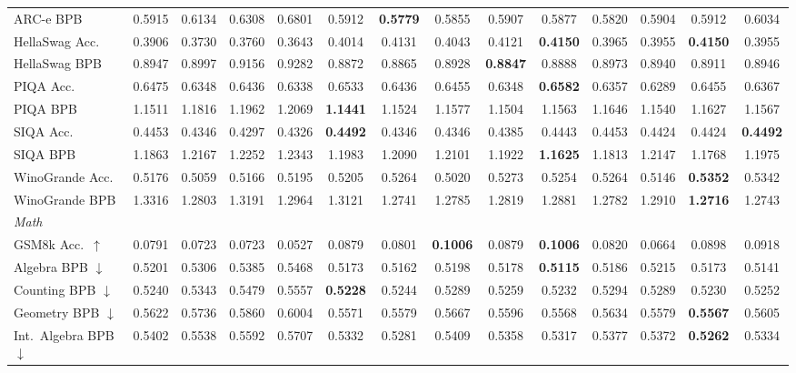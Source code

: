 \documentclass[11pt]{article}
\begin{document}
\begin{table}[t]
{\begin{tabular}{lccccccccccccc}
\quad ARC-e BPB & 0.5915 & 0.6134 & 0.6308 & 0.6801 & 0.5912 & \textbf{0.5779} & 0.5855 & 0.5907 & 0.5877 & 0.5820 & 0.5904 & 0.5912 & 0.6034 \\
\quad HellaSwag Acc. & 0.3906 & 0.3730 & 0.3760 & 0.3643 & 0.4014 & 0.4131 & 0.4043 & 0.4121 & \textbf{0.4150} & 0.3965 & 0.3955 & \textbf{0.4150} & 0.3955 \\
\quad HellaSwag BPB & 0.8947 & 0.8997 & 0.9156 & 0.9282 & 0.8872 & 0.8865 & 0.8928 & \textbf{0.8847} & 0.8888 & 0.8973 & 0.8940 & 0.8911 & 0.8946 \\
\quad PIQA Acc. & 0.6475 & 0.6348 & 0.6436 & 0.6338 & 0.6533 & 0.6436 & 0.6455 & 0.6348 & \textbf{0.6582} & 0.6357 & 0.6289 & 0.6455 & 0.6367 \\
\quad PIQA BPB & 1.1511 & 1.1816 & 1.1962 & 1.2069 & \textbf{1.1441} & 1.1524 & 1.1577 & 1.1504 & 1.1563 & 1.1646 & 1.1540 & 1.1627 & 1.1567 \\
\quad SIQA Acc. & 0.4453 & 0.4346 & 0.4297 & 0.4326 & \textbf{0.4492} & 0.4346 & 0.4346 & 0.4385 & 0.4443 & 0.4453 & 0.4424 & 0.4424 & \textbf{0.4492} \\
\quad SIQA BPB & 1.1863 & 1.2167 & 1.2252 & 1.2343 & 1.1983 & 1.2090 & 1.2101 & 1.1922 & \textbf{1.1625} & 1.1813 & 1.2147 & 1.1768 & 1.1975 \\
\quad WinoGrande Acc. & 0.5176 & 0.5059 & 0.5166 & 0.5195 & 0.5205 & 0.5264 & 0.5020 & 0.5273 & 0.5254 & 0.5264 & 0.5146 & \textbf{0.5352} & 0.5342 \\
\quad WinoGrande BPB & 1.3316 & 1.2803 & 1.3191 & 1.2964 & 1.3121 & 1.2741 & 1.2785 & 1.2819 & 1.2881 & 1.2782 & 1.2910 & \textbf{1.2716} & 1.2743 \\
\midrule
\multicolumn{14}{l}{\textit{Math}} \\
\quad GSM8k Acc.\ $\uparrow$ & 0.0791 & 0.0723 & 0.0723 & 0.0527 & 0.0879 & 0.0801 & \textbf{0.1006} & 0.0879 & \textbf{0.1006} & 0.0820 & 0.0664 & 0.0898 & 0.0918 \\
\quad Algebra BPB $\downarrow$ & 0.5201 & 0.5306 & 0.5385 & 0.5468 & 0.5173 & 0.5162 & 0.5198 & 0.5178 & \textbf{0.5115} & 0.5186 & 0.5215 & 0.5173 & 0.5141 \\
\quad Counting BPB $\downarrow$ & 0.5240 & 0.5343 & 0.5479 & 0.5557 & \textbf{0.5228} & 0.5244 & 0.5289 & 0.5259 & 0.5232 & 0.5294 & 0.5289 & 0.5230 & 0.5252 \\
\quad Geometry BPB $\downarrow$ & 0.5622 & 0.5736 & 0.5860 & 0.6004 & 0.5571 & 0.5579 & 0.5667 & 0.5596 & 0.5568 & 0.5634 & 0.5579 & \textbf{0.5567} & 0.5605 \\
\quad Int.\ Algebra BPB $\downarrow$ & 0.5402 & 0.5538 & 0.5592 & 0.5707 & 0.5332 & 0.5281 & 0.5409 & 0.5358 & 0.5317 & 0.5377 & 0.5372 & \textbf{0.5262} & 0.5334 \\

\end{tabular}}
\end{table}
\end{document}
